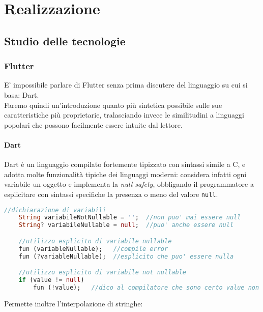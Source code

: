 
\chapter{Realizzazione}
\label{cap:realizzazione}



\section{Studio delle tecnologie}
\subsection{Flutter}
E' impossibile parlare di Flutter senza prima discutere del linguaggio su cui si basa: Dart.\\
Faremo quindi un'introduzione quanto più sintetica possibile sulle sue caratteristiche più proprietarie, tralasciando invece le similitudini a linguaggi popolari che possono facilmente essere intuite dal lettore.
\subsubsection{Dart}
Dart è un linguaggio compilato fortemente tipizzato con sintassi simile a C, e adotta molte funzionalità tipiche dei linguaggi moderni: considera infatti ogni variabile un oggetto e implementa la \textit{null safety}, obbligando il programmatore a esplicitare con sintassi specifiche la presenza o meno del valore \verb+null+.

\begin{lstlisting}[language=dart, firstnumber=1,caption={Dart \textit{null safety}}]
    //dichiarazione di variabili
    String variabileNotNullable = '';  //non puo' mai essere null
    String? variabileNullable = null;  //puo' anche essere null

    //utilizzo esplicito di variabile nullable
    fun (variableNullable);   //compile error
    fun (?variableNullable);  //esplicito che puo' essere nulla

    //utilizzo esplicito di variabile not nullable
    if (value != null)
        fun (!value);   //dico al compilatore che sono certo value non sia null
\end{lstlisting} 

Permette inoltre l'interpolazione di stringhe:

